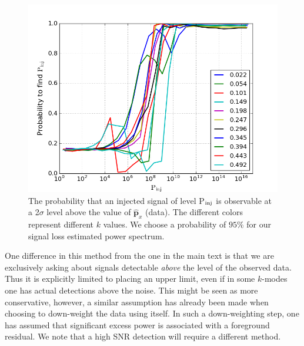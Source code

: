 \documentclass[preprint2,numberedappendix,tighten]{aastex6}  %
\begin{document}
\begin{figure}[tp]
\centering
\includegraphics[width=.5\textwidth]{plots/method2_prob_vs_pinj.png}
\caption{The probability that an injected signal of level P$_{\rm inj}$
is observable at a 2$\sigma$ level above the value of $\widehat{\textbf{p}}_{x}$ (data).
The different colors represent different $k$ values. We choose a probability of $95\%$ for our signal loss estimated power spectrum.}
\label{fig:Prob_vs_Pin}
\end{figure}  
  
One difference in this method from the one in the main text is that we are exclusively asking about signals detectable \emph{above} the level of the observed data. Thus it is explicitly limited to placing an upper limit, even if in some $k$-modes one has actual detections above the noise.  This might be seen as more conservative, however, a similar assumption has already been made when choosing to down-weight the data using itself. In such a down-weighting step, one has assumed that significant excess power is associated with a foreground residual. We note that a high SNR detection will require a different method.
  
\end{document}
